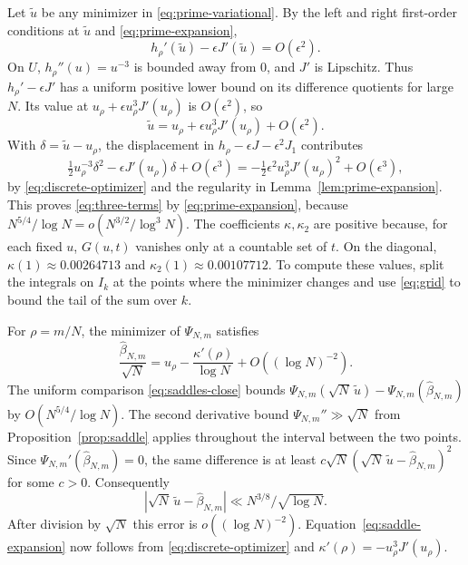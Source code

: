 \documentclass[11pt]{amsart}
\theoremstyle{remark}
\begin{document}
Let \(\widetilde u\) be any minimizer in \eqref{eq:prime-variational}. By the left and right first-order conditions at \(\widetilde u\) and \eqref{eq:prime-expansion},
\[
 h_\rho'(\widetilde u)-\epsilon J'(\widetilde u)=O(\epsilon^2).
\]
On \(U\), \(h_\rho''(u)=u^{-3}\) is bounded away from \(0\), and \(J'\) is Lipschitz. Thus \(h_\rho'-\epsilon J'\) has a uniform positive lower bound on its difference quotients for large \(N\). Its value at \(u_\rho+\epsilon u_\rho^3J'(u_\rho)\) is \(O(\epsilon^2)\), so
\begin{equation}
 \widetilde u=u_\rho+\epsilon u_\rho^3J'(u_\rho)+O(\epsilon^2).
 \label{eq:discrete-optimizer}
\end{equation}
With \(\delta=\widetilde u-u_\rho\), the displacement in \(h_\rho-\epsilon J-\epsilon^2 J_1\) contributes
\[
 \tfrac12u_\rho^{-3}\delta^2-\epsilon J'(u_\rho)\delta+O(\epsilon^3)
 =-\tfrac12\epsilon^2u_\rho^3J'(u_\rho)^2+O(\epsilon^3),
\]
by \eqref{eq:discrete-optimizer} and the regularity in Lemma~\ref{lem:prime-expansion}. This proves \eqref{eq:three-terms} by \eqref{eq:prime-expansion}, because \(N^{5/4}/\log N=o(N^{3/2}/\log^3 N)\). The coefficients \(\kappa,\kappa_2\) are positive because, for each fixed \(u\), \(G(u,t)\) vanishes only at a countable set of \(t\). On the diagonal, \(\kappa(1)\approx0.00264713\) and \(\kappa_2(1)\approx0.00107712\). To compute these values, split the integrals on \(I_k\) at the points where the minimizer changes and use \eqref{eq:grid} to bound the tail of the sum over \(k\).

For \(\rho=m/N\), the minimizer of \(\Psi_{N,m}\) satisfies
\begin{equation}
 \frac{\widehat\beta_{N,m}}{\sqrt N}
     = u_\rho-\frac{\kappa'(\rho)}{\log N}
         +O((\log N)^{-2}).
 \label{eq:saddle-expansion}
\end{equation}
The uniform comparison \eqref{eq:saddles-close} bounds
\(\Psi_{N,m}(\sqrt N\,\widetilde u)-\Psi_{N,m}(\widehat\beta_{N,m})\)
by \(O(N^{5/4}/\log N)\). The second derivative bound \(\Psi_{N,m}''\gg\sqrt N\) from Proposition~\ref{prop:saddle} applies throughout the interval between the two points. Since \(\Psi_{N,m}'(\widehat\beta_{N,m})=0\), the same difference is at least \(c\sqrt N(\sqrt N\,\widetilde u-\widehat\beta_{N,m})^2\) for some \(c>0\). Consequently
\[
 \left|\sqrt N\,\widetilde u-\widehat\beta_{N,m}\right|
 \ll N^{3/8}/\sqrt{\log N}.
\]
After division by \(\sqrt N\) this error is \(o((\log N)^{-2})\). Equation~\eqref{eq:saddle-expansion} now follows from \eqref{eq:discrete-optimizer} and \(\kappa'(\rho)=-u_\rho^3J'(u_\rho)\).
\end{document}
